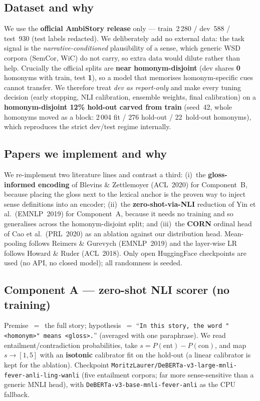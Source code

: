 \documentclass[11pt]{article}
\begin{document}
\subsection{Dataset and why}
We use the \textbf{official AmbiStory release} only --- train~2\,280 /
dev~588 / test~930 (test labels redacted). We deliberately add no external
data: the task signal is the \emph{narrative-conditioned} plausibility of a
sense, which generic WSD corpora (SemCor, WiC) do not carry, so extra data
would dilute rather than help. Crucially the official splits are
\textbf{near homonym-disjoint} (dev shares \textbf{0} homonyms with train,
test \textbf{1}), so a model that memorises homonym-specific cues cannot
transfer. We therefore treat \emph{dev as report-only} and make every tuning
decision (early stopping, NLI calibration, ensemble weights, final
calibration) on a \textbf{homonym-disjoint 12\% hold-out carved from train}
(seed~42, whole homonyms moved as a block: 2\,004 fit / 276 hold-out /
22~hold-out homonyms), which reproduces the strict dev/test regime internally.

\subsection{Papers we implement and why}
We re-implement two literature lines and contrast a third: (i)~the
\textbf{gloss-informed encoding} of Blevins \& Zettlemoyer (ACL~2020) for
Component~B, because placing the gloss next to the lexical anchor is the
proven way to inject sense definitions into an encoder; (ii)~the
\textbf{zero-shot-via-NLI} reduction of Yin et al.\ (EMNLP~2019) for
Component~A, because it needs no training and so generalises across the
homonym-disjoint split; and (iii)~the \textbf{CORN} ordinal head of Cao et al.\
(PRL~2020) as an ablation against our distribution head. Mean-pooling follows
Reimers \& Gurevych (EMNLP~2019) and the layer-wise LR follows Howard \& Ruder
(ACL~2018). Only open HuggingFace checkpoints are used (no API, no closed
model); all randomness is seeded.

\subsection{Component A --- zero-shot NLI scorer (no training)}
Premise~$=$~the full story; hypothesis~$=$ ``\texttt{In this story, the word
"<homonym>" means <gloss>.}'' (averaged with one paraphrase). We read
entailment/contradiction probabilities, take
$s=P(\text{ent})-P(\text{con})$, and map $s\!\to\![1,5]$ with an
\textbf{isotonic} calibrator fit on the hold-out (a linear calibrator is kept
for the ablation). Checkpoint
\texttt{MoritzLaurer/DeBERTa-v3-large-mnli-fever-anli-ling-wanli} (five
entailment corpora; far more sense-sensitive than a generic MNLI head),
with \texttt{DeBERTa-v3-base-mnli-fever-anli} as the CPU fallback.
\end{document}
